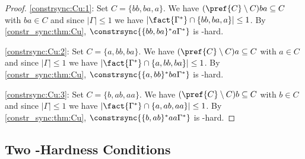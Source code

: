 \begin{proof}
\ref{constrsync:Cu:1}: Set $C = \{bb,ba,a\}$. We have $(\pref{C}\setminus C)ba \subseteq C$ with $ba \in C$
and since $|\Gamma| \le 1$ we have $|\fact{\Gamma^*} \cap \{bb,ba,a\}| \le 1$.
By \cref{constr_sync:thm:Cu}, $\constrsync{\{bb,ba\}^*a\Gamma^*}$
is \PSPACE-hard.

\ref{constrsync:Cu:2}: Set $C = \{a,bb,ba\}$. We have $(\pref{C}\setminus C)a \subseteq C$ with $a \in C$
and since $|\Gamma| \le 1$ we have $|\fact{\Gamma^*} \cap \{a,bb,ba\}| \le 1$.
By \cref{constr_sync:thm:Cu}, $\constrsync{\{a,bb\}^*ba\Gamma^*}$
is \PSPACE-hard.

\ref{constrsync:Cu:3}: Set $C = \{b,ab,aa\}$. We have $(\pref{C}\setminus C)b \subseteq C$ with $b \in C$
and since $|\Gamma| \le 1$ we have $|\fact{\Gamma^*} \cap \{a,ab,aa\}| \le 1$.
By \cref{constr_sync:thm:Cu}, $\constrsync{\{b,ab\}^*aa\Gamma^*}$
is \PSPACE-hard.
\end{proof}

\subsection{Two \NP-Hardness Conditions}
\label{constr_sync:sec:NP-hardness}


